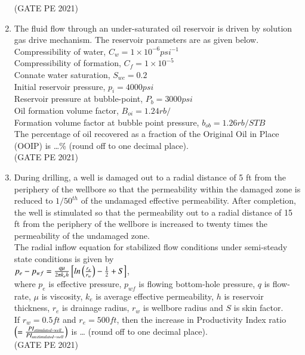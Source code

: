 \documentclass[journal,12pt,onecolumn]{IEEEtran}
\theoremstyle{remark}
\begin{document}
\begin{enumerate}
\hfill{(GATE PE 2021)}

\item The fluid flow through an under-saturated oil reservoir is driven by solution gas drive mechanism. The reservoir parameters are as given below.\\
Compressibility of water, $C_w=1\times10^{-6}psi^{-1}$\\
Compressibility of formation, $C_f=1\times10^{-5}$\\
Connate water saturation, $S_{wc}=0.2$\\
Initial reservoir pressure, $p_i=4000psi$\\
Reservoir pressure at bubble-point, $P_b=3000psi$\\
Oil formation volume factor, $B_{oi}=1.24rb/$\\ 
Formation volume factor at bubble point pressure, $b_{ob}=1.26rb/STB$\\
The percentage of oil recovered as a fraction of the Original Oil in Place (OOIP) is \dots \% (round off to one decimal place).\\

\hfill{(GATE PE 2021)}

\item During drilling, a well is damaged out to a radial distance of 5 ft from the periphery of the wellbore so that the permeability within the damaged zone is reduced to $1/50^{th}$ of the undamaged effective permeability. After completion, the well is stimulated so that the permeability out to a radial distance of 15 ft from the periphery of the wellbore is increased to twenty times the permeability of the undamaged zone.\\
The radial inflow equation for stabilized flow conditions under semi-steady state conditions is given by\\
$p_e-p_{wf}=\frac{q\mu}{2\pi k_eh}{}\left[ln\left(\frac{r_e}{r_w}\right)-\frac{1}{2}+S\right]$,\\
where $p_e$ is effective pressure, $p_{wf}$ is flowing bottom-hole pressure, $q$ is flow-rate, $\mu$ is viscosity, $k_e$ is average effective permeability, $h$ is reservoir thickness, $r_e$ is drainage radius, $r_w$ is wellbore radius and $S$ is skin factor.\\
If $r_w=0.5ft$ and $r_e=500ft$, then the increase in Productivity Index ratio $\left(=\frac{PI_{stimulated-well}}{PI_{unstimulated-well}}\right)$ is \dots
(round off to one decimal place).\\

\hfill{(GATE PE 2021)}


\end{enumerate}
\end{document}
